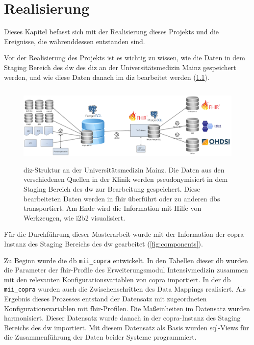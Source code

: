 \chapter{Realisierung} \label{ch:results}

Dieses Kapitel befasst sich mit der Realisierung dieses Projekts und die Ereignisse, die währenddessen entstanden sind.

Vor der Realisierung des Projekts ist es wichtig zu wissen, wie die Daten in dem Staging Bereich des \ac{dw} des \ac{diz} an der Universitätsmedizin Mainz gespeichert werden, und wie diese Daten danach im \ac{diz} bearbeitet werden (\ref{fig:dizummz}).

\begin{figure}[ht]
	\centering
	\includegraphics[height=4cm]{figures/diz_ummz}
	\caption[\acs{diz}-Struktur an der Universitätsmedizin Mainz] {\acs{diz}-Struktur an der Universitätsmedizin Mainz. Die Daten aus den verschiedenen Quellen in der Klinik werden pseudonymisiert in dem Staging Bereich des \ac{dw} zur Bearbeitung gespeichert. Diese bearbeiteten Daten werden in \ac{fhir} überführt oder zu anderen \acp{db} transportiert. Am Ende wird die Information mit Hilfe von Werkzeugen, wie i2b2 visualisiert.}
	\label{fig:dizummz}
\end{figure}

 Für die Durchführung dieser Masterarbeit wurde mit der Information der \ac{copra}-Instanz des Staging Bereichs des \ac{dw} gearbeitet (\ref{fig:components}).

 Zu Beginn wurde die \ac{db} \texttt{mii\_copra} entwickelt. In den Tabellen dieser \ac{db} wurden die Parameter der \ac{fhir}-Profile des Erweiterungsmodul \glqq Intensivmedizin\grqq{} zusammen mit den relevanten Konfigurationsvariablen von \ac{copra} importiert. In der \ac{db} \texttt{mii\_copra} wurden auch die Zwischenschritten des Data Mappings realisiert. Als Ergebnis dieses Prozesses entstand der Datensatz mit zugeordneten Konfigurationsvariablen mit \ac{fhir}-Profilen. Die Maßeinheiten im Datensatz wurden harmonisiert. Dieser Datensatz wurde danach in der \ac{copra}-Instanz des Staging Bereichs des \ac{dw} importiert. Mit diesem Datensatz als Basis wurden \ac{sql}-Views für die Zusammenführung der Daten beider Systeme programmiert.

